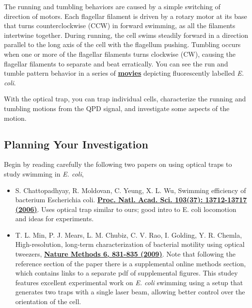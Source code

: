 \documentclass{../lab}
\begin{document}
The running and tumbling behaviors are caused by a simple switching of direction of motors. Each flagellar filament is driven by a rotary motor at its base that turns counterclockwise (CCW) in forward swimming, as all the filaments intertwine together. During running, the cell swims steadily forward in a direction parallel to the long axis of the cell with the flagellum pushing. Tumbling occurs when one or more of the flagellar filaments turns clockwise (CW), causing the flagellar filaments to separate and beat erratically. You can see the run and tumble pattern behavior in a series of \href{http://www.rowland.harvard.edu/labs/bacteria/movies/ecoli.php}{\textbf{movies}} depicting fluorescently labelled \emph{E. coli}.

With the optical trap, you can trap individual cells, characterize the running and tumbling motions from the QPD signal, and investigate some aspects of the motion.

\subsection{Planning Your Investigation}

Begin by reading carefully the following two papers on using optical traps to study swimming in \emph{E. coli},

\begin{itemize}
    \item S. Chattopadhyay, R. Moldovan, C. Yeung, X. L. Wu, Swimming efficiency of bacterium Escherichia coli. \href{http://www.ncbi.nlm.nih.gov/pmc/articles/PMC1564254/}{\textbf{Proc. Natl. Acad. Sci. 103(37): 13712-13717 (2006)}}. Uses optical trap similar to ours; good intro to E. coli locomotion and ideas for experiments.

    \item T. L. Min, P. J. Mears, L. M. Chubiz, C. V. Rao, I. Golding, Y. R. Chemla, High-resolution, long-term characterization of bacterial motility using optical tweezers, \href{http://www.nature.com/nmeth/journal/v6/n11/full/nmeth.1380.html}{\textbf{Nature Methods 6, 831-835 (2009)}}. Note that following the reference section of the paper there is a supplemental online methods section, which contains links to a separate pdf of supplemental figures. This studey features excellent experimental work on \emph{E. coli} swimming using a setup that generates two traps with a single laser beam, allowing better control over the orientation of the cell.
\end{itemize}
\end{document}
